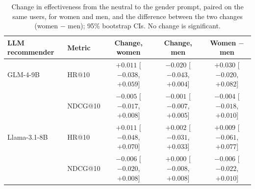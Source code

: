 \begin{table}[t]
\centering\small
\caption{Change in effectiveness from the neutral to the gender prompt, paired on the same users, for women and men, and the difference between the two changes (women $-$ men); 95\% bootstrap CIs. No change is significant.}
\label{tab:effectiveness-change}
\begin{tabular}{llccc}
\toprule
LLM recommender & Metric & Change, women & Change, men & Women $-$ men \\
\midrule
GLM-4-9B & HR@10 & $+0.011$ [$-0.038$, $+0.059$] & $-0.020$ [$-0.043$, $+0.004$] & $+0.030$ [$-0.020$, $+0.082$] \\
 & NDCG@10 & $-0.005$ [$-0.017$, $+0.008$] & $-0.001$ [$-0.007$, $+0.005$] & $-0.004$ [$-0.018$, $+0.010$] \\
Llama-3.1-8B & HR@10 & $+0.011$ [$-0.048$, $+0.070$] & $+0.002$ [$-0.031$, $+0.033$] & $+0.009$ [$-0.061$, $+0.077$] \\
 & NDCG@10 & $-0.006$ [$-0.020$, $+0.008$] & $+0.000$ [$-0.008$, $+0.008$] & $-0.006$ [$-0.022$, $+0.010$] \\
\bottomrule
\end{tabular}
\end{table}
